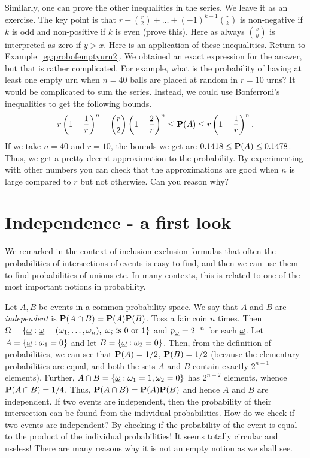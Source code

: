 \documentclass[preprint,  11pt]{amsart}
\def\omeg{\underline{\ome}}
\begin{document}
Similarly, one can prove the other inequalities in the series. We leave it as an exercise. The key point is that $r-\binom{r}{2}+\ldots +(-1)^{k-1}\binom{r}{k}$ is non-negative if $k$ is odd and non-positive if $k$ is even (prove this). Here as always $\binom{x}{y}$ is interpreted as zero if $y>x$.
\eprf
Here is an application of these inequalities. 
\beg Return to Example~\ref{eg:probofemptyurn2}. We obtained an exact expression for the answer, but that is rather complicated. For example, what is the probability of having at least one empty urn when $n=40$ balls are placed at random in $r=10$ urns? It would be complicated to sum the series. Instead, we could use Bonferroni's inequalities to get the following bounds.
$$ 
 r\l(1-\frac{1}{r}\r)^{n}-\binom{r}{2}\l(1-\frac{2}{r}\r)^{n}\le \P(A) \le r\l(1-\frac{1}{r}\r)^{n}.
$$
If we take $n=40$ and $r=10$, the bounds we get are $0.1418\le \P(A)\le 0.1478$. Thus, we get a pretty decent approximation to the probability. By experimenting with other numbers you can check that the approximations are good when $n$ is large compared to $r$ but not otherwise. Can you reason why?
\eeg




\section{Independence - a first look}
We remarked in the context of inclusion-exclusion formulas that often the probabilities of intersections of events is easy to find, and then we can use them to find probabilities of unions etc. In many contexts, this is related to one of the most important notions in probability.

\bdefn Let $A,B$ be events in a common probability space. We say that $A$ and $B$ are {\em independent} is $\P(A\cap B)=\P(A)\P(B)$.
\edefn
\beg Toss a fair coin $n$ times. Then $\Ome=\{\omeg\suchthat \omeg=(\ome_{1},\ldots ,\ome_{n}), \; \ome_{i}\mb{ is }0\mb{ or }1\}$ and $p_{\omeg}=2^{-n}$ for each $\omeg$. Let $A=\{\omeg\suchthat \ome_{1}=0\}$ and let $B=\{\omeg\suchthat \ome_{2}=0\}$. Then, from the definition of probabilities, we can see that $\P(A)=1/2$, $\P(B)=1/2$ (because the elementary probabilities are equal, and both the sets $A$ and $B$ contain exactly $2^{n-1}$ elements). Further, $A\cap B=\{\omeg\suchthat \ome_{1}=1, \ome_{2}=0\}$ has $2^{n-2}$ elements, whence $\P(A\cap B)=1/4$. Thus, $\P(A\cap B)=\P(A)\P(B)$ and hence $A$ and $B$ are independent. 
\eeg
If two events are independent, then the probability of their intersection can be found from the individual probabilities. How do we check if two events are independent? By checking if the probability of the event is equal to the product of the individual probabilities! It seems totally circular and useless! There are many reasons why it is not an empty notion as we shall see. 
\end{document}
